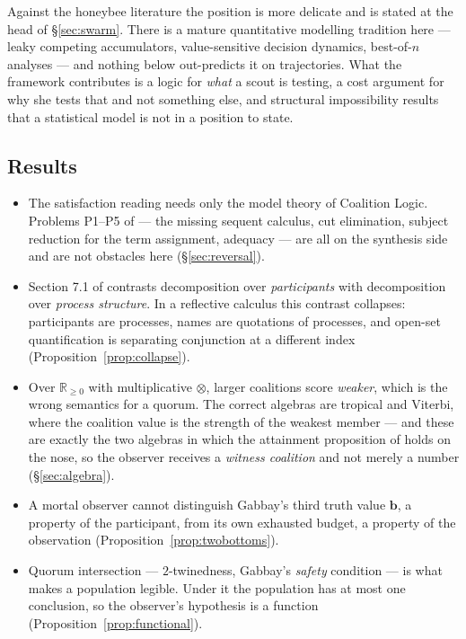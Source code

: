 \documentclass[11pt,a4paper]{article}
\theoremstyle{plain}
\theoremstyle{definition}
\theoremstyle{remark}
\newcommand{\bv}{\mathbf{b}}
\begin{document}
Against the honeybee literature the position is more delicate and is stated at
the head of \S\ref{sec:swarm}. There is a mature quantitative modelling
tradition here --- leaky competing accumulators, value-sensitive decision
dynamics, best-of-$n$ analyses \cite{Seeley12,Pais13,Reina17} --- and nothing
below out-predicts it on trajectories. What the framework contributes is a logic
for \emph{what} a scout is testing, a cost argument for why she tests that and
not something else, and structural impossibility results that a statistical
model is not in a position to state.

\subsection{Results}

\begin{itemize}[leftmargin=1.4em]
\item The satisfaction reading needs only the model theory of Coalition Logic.
      Problems P1--P5 of \cite{consensus} --- the missing sequent calculus, cut
      elimination, subject reduction for the term assignment, adequacy --- are
      all on the synthesis side and are not obstacles here
      (\S\ref{sec:reversal}).
\item Section 7.1 of \cite{consensus} contrasts decomposition over
      \emph{participants} with decomposition over \emph{process structure}. In
      a reflective calculus this contrast collapses: participants are
      processes, names are quotations of processes, and open-set quantification
      is separating conjunction at a different index
      (Proposition~\ref{prop:collapse}).
\item Over $\mathbb{R}_{\ge 0}$ with multiplicative $\otimes$, larger coalitions
      score \emph{weaker}, which is the wrong semantics for a quorum. The
      correct algebras are tropical and Viterbi, where the coalition value is
      the strength of the weakest member --- and these are exactly the two
      algebras in which the attainment proposition of \cite{choicef} holds on
      the nose, so the observer receives a \emph{witness coalition} and not
      merely a number (\S\ref{sec:algebra}).
\item A mortal observer cannot distinguish Gabbay's third truth value $\bv$, a
      property of the participant, from its own exhausted budget, a property of
      the observation (Proposition~\ref{prop:twobottoms}).
\item Quorum intersection --- $2$-twinedness, Gabbay's \emph{safety} condition
      --- is what makes a population legible. Under it the population has at
      most one conclusion, so the observer's hypothesis is a function
      (Proposition~\ref{prop:functional}).
\end{itemize}
\end{document}
